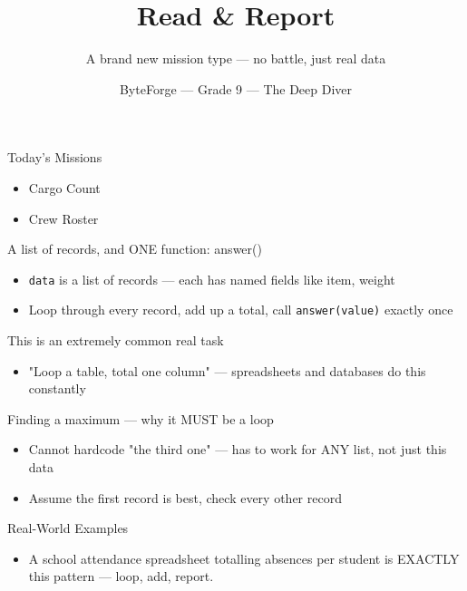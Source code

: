 \documentclass[aspectratio=169]{beamer}
\title{Read \& Report}
\subtitle{A brand new mission type --- no battle, just real data}
\author{ByteForge --- Grade 9 --- The Deep Diver}
\date{}
\begin{document}
\begin{frame}
    \titlepage
\end{frame}

\begin{frame}{Today's Missions}
    \Large
    \begin{itemize}
        \item Cargo Count
        \item Crew Roster
    \end{itemize}
\end{frame}

\begin{frame}{A list of records, and ONE function: answer()}
    \large
    \begin{itemize}
        \item \texttt{data} is a list of records --- each has named fields like item, weight
        \item Loop through every record, add up a total, call \texttt{answer(value)} exactly once
    \end{itemize}
\end{frame}


\begin{frame}{This is an extremely common real task}
    \large
    \begin{itemize}
        \item "Loop a table, total one column" --- spreadsheets and databases do this constantly
    \end{itemize}
\end{frame}


\begin{frame}{Finding a maximum --- why it MUST be a loop}
    \large
    \begin{itemize}
        \item Cannot hardcode "the third one" --- has to work for ANY list, not just this data
        \item Assume the first record is best, check every other record
    \end{itemize}
\end{frame}

\begin{frame}{Real-World Examples}
    \large
    \begin{itemize}
        \item A school attendance spreadsheet totalling absences per student is EXACTLY this pattern --- loop, add, report.
    \end{itemize}
\end{frame}
\end{document}
